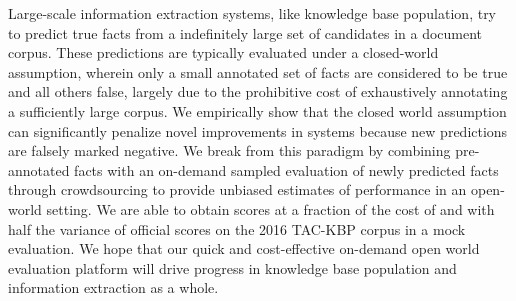 Large-scale information extraction systems, like knowledge base population, try to predict true facts from a indefinitely large set of candidates in a document corpus.
These predictions are typically evaluated under a closed-world assumption, wherein only a small annotated set of facts are considered to be true and all others false, largely due to the prohibitive cost of exhaustively annotating a sufficiently large corpus.
%
We empirically show that the closed world assumption can significantly penalize novel improvements in systems because new predictions are falsely marked negative.
%
We break from this paradigm by combining pre-annotated facts with an on-demand sampled evaluation of newly predicted facts through crowdsourcing to provide unbiased estimates of performance in an open-world setting.
%
We are able to obtain scores at a fraction of the cost of and with half the variance of official scores on the 2016 TAC-KBP corpus in a mock evaluation.
%
We hope that our quick and cost-effective on-demand open world evaluation platform will drive progress in knowledge base population and information extraction as a whole.





